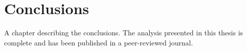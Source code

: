 \chapter{Conclusions}
\label{chap:conclusions}

A chapter describing the conclusions. The analysis presented in this thesis is complete and has been published in a peer-reviewed journal\cite{SUS17006}.
